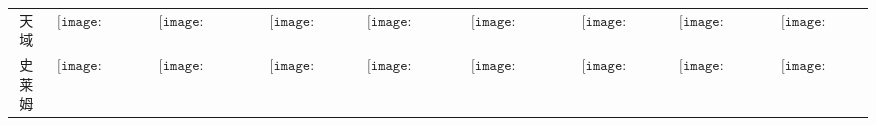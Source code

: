 \begin{longtable}{|c|cccccccc|}
天域&$\begin{array}{c}\texttt{[image: figures/Skyware\_Candle.png]}\end{array}$&$\begin{array}{c}\texttt{[image: figures/Skyware\_Candelabra.png]}\end{array}$&$\begin{array}{c}\texttt{[image: figures/Skyware\_Lamp.png]}\end{array}$&$\begin{array}{c}\texttt{[image: figures/Skyware\_Lantern.png]}\end{array}$&$\begin{array}{c}\texttt{[image: figures/Skyware\_Chandelier.png]}\end{array}$&$\begin{array}{c}\texttt{[image: figures/Skyware\_Door.png]}\end{array}$&$\begin{array}{c}\texttt{[image: figures/Skyware\_Toilet.png]}\end{array}$&$\begin{array}{c}\texttt{[image: figures/Skyware\_Chest.png]}\end{array}$\\
史莱姆&$\begin{array}{c}\texttt{[image: figures/Slime\_Candle.png]}\end{array}$&$\begin{array}{c}\texttt{[image: figures/Slime\_Candelabra.png]}\end{array}$&$\begin{array}{c}\texttt{[image: figures/Slime\_Lamp.png]}\end{array}$&$\begin{array}{c}\texttt{[image: figures/Slime\_Lantern.png]}\end{array}$&$\begin{array}{c}\texttt{[image: figures/Slime\_Chandelier.png]}\end{array}$&$\begin{array}{c}\texttt{[image: figures/Slime\_Door.png]}\end{array}$&$\begin{array}{c}\texttt{[image: figures/Slime\_Toilet.png]}\end{array}$&$\begin{array}{c}\texttt{[image: figures/Slime\_Chest.png]}\end{array}$\\

\end{longtable}
